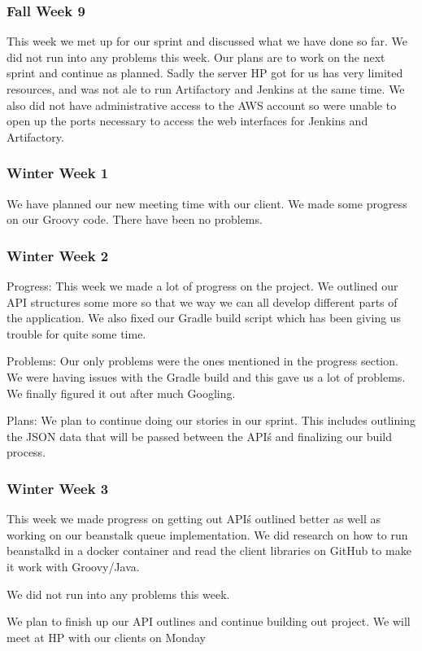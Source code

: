 \documentclass[onecolumn, draftclsnofoot,10pt, compsoc]{IEEEtran}
\begin{document}
\subsubsection*{Fall Week 9}
This week we met up for our sprint and discussed what we have done so far. We did not run into any problems this week. Our plans are to work on the next sprint and continue as planned.
Sadly the server HP got for us has very limited resources, and was not ale to run Artifactory and Jenkins at the same time. We also did not have administrative access to the AWS account so were unable to open up the ports necessary to access the web interfaces for Jenkins and Artifactory.
\subsubsection*{Winter Week 1}
We have planned our new meeting time with our client. We made some progress on our Groovy code. There have been no problems.

\subsubsection*{Winter Week 2}
Progress: This week we made a lot of progress on the project. We outlined our API structures some more so that we way we can all develop different parts of the application. We also fixed our Gradle build script which has been giving us trouble for quite some time. 

Problems: Our only problems were the ones mentioned in the progress section. We were having issues with the Gradle build and this gave us a lot of problems. We finally figured it out after much Googling.

Plans: We plan to continue doing our stories in our sprint. This includes outlining the JSON data that will be passed between the API\'s and finalizing our build process. 
\subsubsection*{Winter Week 3}
This week we made progress on getting out API\'s outlined better as well as working on our beanstalk queue implementation. We did research on how to run beanstalkd in a docker container and read the client libraries on GitHub to make it work with Groovy/Java.

We did not run into any problems this week.

We plan to finish up our API outlines and continue building out project. We will meet at HP with our clients on Monday
\end{document}
